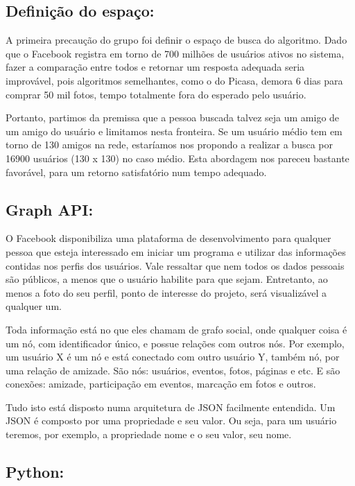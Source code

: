 \documentclass[10pt,a4paper]{article}
\begin{document}
\subsection*{Definição do espaço:}

A primeira precaução do grupo foi definir o espaço de busca do algoritmo. Dado que o Facebook registra em torno de 700 milhões de usuários ativos no sistema, fazer a comparação entre todos e retornar um resposta adequada seria improvável, pois algoritmos semelhantes, como o do Picasa, demora 6 dias para comprar 50 mil fotos, tempo totalmente fora do esperado pelo usuário.

Portanto, partimos da premissa que a pessoa buscada talvez seja um amigo de um amigo do usuário e limitamos nesta fronteira. Se um usuário médio tem em torno de 130 amigos na rede, estaríamos nos propondo a realizar a busca por 16900 usuários (130 x 130) no caso médio. Esta abordagem nos pareceu bastante favorável, para um retorno satisfatório num tempo adequado.

\subsection*{Graph API:}

O Facebook disponibiliza uma plataforma de desenvolvimento para qualquer pessoa que esteja interessado em iniciar um programa e utilizar das informações contidas nos perfis dos usuários. Vale ressaltar que nem todos os dados pessoais são públicos, a menos que o usuário habilite para que sejam. Entretanto, ao menos a foto do seu perfil, ponto de interesse do projeto, será visualizável a qualquer um.

Toda informação está no que eles chamam de grafo social, onde qualquer coisa é um nó, com identificador único, e possue relações com outros nós. Por exemplo, um usuário X é um nó e está conectado com outro usuário Y, também nó, por uma relação de amizade. São nós: usuários, eventos, fotos, páginas e etc. E são conexões: amizade, participação em eventos, marcação em fotos e outros.

Tudo isto está disposto numa arquitetura de JSON facilmente entendida. Um JSON é composto por uma propriedade e seu valor. Ou seja, para um usuário teremos, por exemplo, a propriedade nome e o seu valor, seu nome.

\subsection*{Python:}
\end{document}
